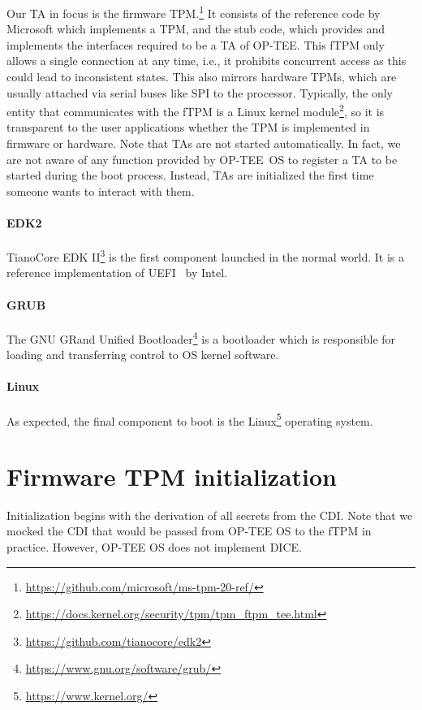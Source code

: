 Our TA in focus is the firmware TPM\@.\footnote{\url{https://github.com/microsoft/ms-tpm-20-ref/}}
It consists of the reference code by Microsoft which implements a TPM, and the stub code, which provides and implements the interfaces required to be a TA of OP-TEE\@.
This fTPM only allows a single connection at any time, i.e., it prohibits concurrent access as this could lead to inconsistent states.
This also mirrors hardware TPMs, which are usually attached via serial buses like SPI to the processor.
Typically, the only entity that communicates with the fTPM is a Linux kernel module\footnote{\url{https://docs.kernel.org/security/tpm/tpm_ftpm_tee.html}}, so it is transparent to the user applications whether the TPM is implemented in firmware or hardware.
Note that TAs are not started automatically.
In fact, we are not aware of any function provided by OP-TEE~OS to register a TA to be started during the boot process. 
Instead, TAs are initialized the first time someone wants to interact with them.

\paragraph{EDK2}
TianoCore EDK II\footnote{\url{https://github.com/tianocore/edk2}} is the first component launched in the normal world.
It is a reference implementation of UEFI~\cite{UEFI} by Intel.

\paragraph{GRUB}
The GNU GRand Unified Bootloader\footnote{\url{https://www.gnu.org/software/grub/}} is a bootloader which is responsible for loading and transferring control to OS kernel software.

\paragraph{Linux}
As expected, the final component to boot is the Linux\footnote{\url{https://www.kernel.org/}} operating system.

\section{Firmware TPM initialization}

Initialization begins with the derivation of all secrets from the CDI\@.
Note that we mocked the CDI that would be passed from OP-TEE OS to the fTPM in practice.
However, OP-TEE OS does not implement DICE\@.

